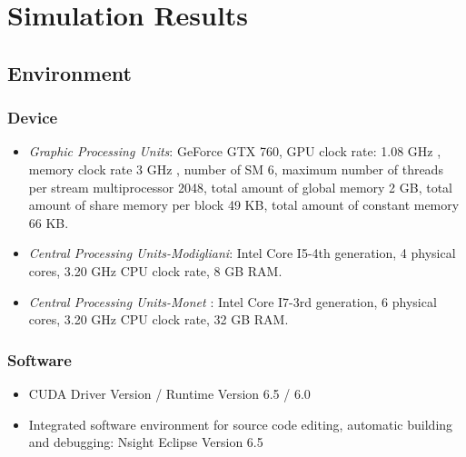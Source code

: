 \documentclass[letterpaper, 10pt, conference,twoside]{ieeeconf}
\begin{document}
\section{Simulation Results}\label{simulation}
\subsection{Environment}
\subsubsection{Device}
\begin{itemize}
\item \emph{Graphic Processing Units}: GeForce GTX 760, GPU clock rate: 1.08 GHz , memory clock rate 3 GHz , number of SM 6, maximum number of threads per stream multiprocessor 2048, total amount of global memory 2 GB, total amount of share memory per block 49 KB, total amount of constant memory 66 KB. 
\item \emph{Central Processing Units-Modigliani}: Intel Core I5-4th generation, 4 physical cores, 3.20 GHz CPU clock rate, 8 GB RAM.
\item \emph{Central Processing Units-Monet} : Intel Core I7-3rd generation, 6 physical cores, 3.20 GHz CPU clock rate, 32 GB RAM.
\end{itemize}
\subsubsection{Software}
\begin{itemize}
\item CUDA Driver Version / Runtime Version      6.5 / 6.0
\item Integrated software environment for source code editing, automatic building and debugging: Nsight Eclipse Version 6.5
\end{itemize}
\end{document}
